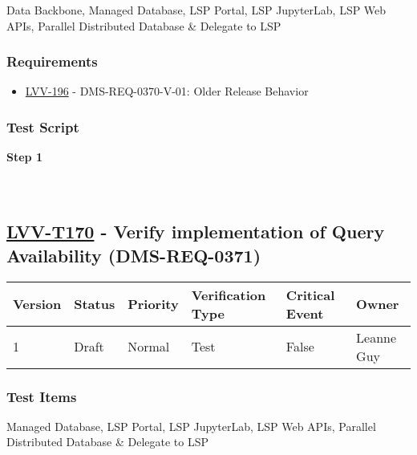 Data Backbone, Managed Database, LSP Portal, LSP JupyterLab, LSP Web
APIs, Parallel Distributed Database \& Delegate to LSP

\hypertarget{requirements-69}{%
\subsubsection{Requirements}\label{requirements-69}}

\begin{itemize}
\tightlist
\item
  \href{https://jira.lsstcorp.org/browse/LVV-196}{LVV-196} -
  DMS-REQ-0370-V-01: Older Release Behavior
\end{itemize}

\hypertarget{test-script-69}{%
\subsubsection{Test Script}\label{test-script-69}}

\textbf{Step 1}\\
~\\
~\\

\hypertarget{lvv-t170---verify-implementation-of-query-availability-dms-req-0371}{%
\subsection{\texorpdfstring{\href{https://jira.lsstcorp.org/secure/Tests.jspa\#/testCase/LVV-T170}{LVV-T170}
- Verify implementation of Query Availability
(DMS-REQ-0371)}{LVV-T170 - Verify implementation of Query Availability (DMS-REQ-0371)}}\label{lvv-t170---verify-implementation-of-query-availability-dms-req-0371}}

\begin{longtable}[]{@{}llllll@{}}
\toprule
Version & Status & Priority & Verification Type & Critical Event &
Owner\tabularnewline
\midrule
\endhead
1 & Draft & Normal & Test & False & Leanne Guy\tabularnewline
\bottomrule
\end{longtable}

\hypertarget{test-items-70}{%
\subsubsection{Test Items}\label{test-items-70}}

Managed Database, LSP Portal, LSP JupyterLab, LSP Web APIs, Parallel
Distributed Database \& Delegate to LSP

